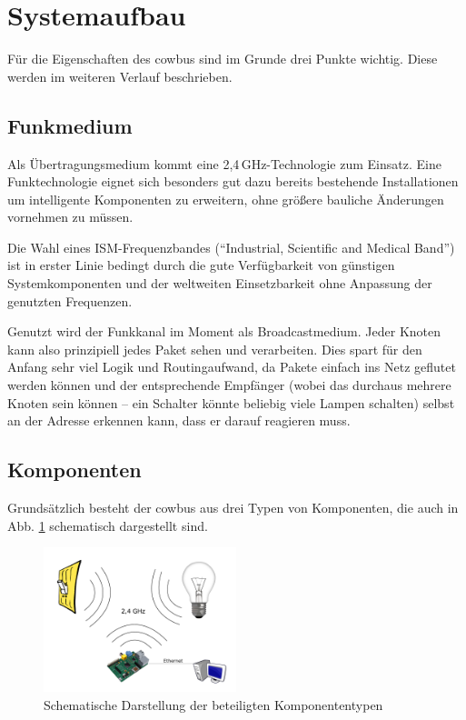 \documentclass{IEEEtran}
\begin{document}
\section{Systemaufbau}
Für die Eigenschaften des cowbus sind im Grunde drei Punkte wichtig.
Diese werden im weiteren Verlauf beschrieben.
    \subsection{Funkmedium}
        Als Übertragungsmedium kommt eine 2,4\,GHz-Technologie
        zum Einsatz. Eine Funktechnologie eignet sich besonders gut dazu
        bereits bestehende Installationen um intelligente Komponenten
        zu erweitern, ohne größere bauliche Änderungen vornehmen zu müssen.

        Die Wahl eines ISM-Frequenzbandes (\enquote{Industrial, Scientific and Medical Band})
        ist in erster Linie bedingt durch die gute Verfügbarkeit von günstigen
        Systemkomponenten und der weltweiten Einsetzbarkeit ohne Anpassung der
        genutzten Frequenzen.

        Genutzt wird der Funkkanal im Moment als Broadcastmedium.
        Jeder Knoten kann also prinzipiell jedes Paket sehen und verarbeiten.
        Dies spart für den Anfang sehr viel Logik und Routingaufwand,
        da Pakete einfach ins Netz geflutet werden können und der entsprechende
        Empfänger (wobei das durchaus mehrere Knoten sein können -- ein Schalter
        könnte beliebig viele Lampen schalten) selbst an der Adresse erkennen
        kann, dass er darauf reagieren muss.

    \subsection{Komponenten}
        Grundsätzlich besteht der cowbus aus drei Typen von Komponenten,
        die auch in Abb. \ref{fig:comp} schematisch dargestellt sind.

        \begin{figure}
            \centering
            \includegraphics[width=0.5\textwidth]{img/system}
            \caption{Schematische Darstellung der beteiligten Komponententypen}
            \label{fig:comp}
        \end{figure}
\end{document}
